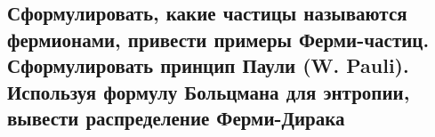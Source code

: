 \subsection{Сформулировать, какие частицы называются фермионами, привести примеры Ферми-частиц.
Сформулировать принцип Паули (W. Pauli). Используя формулу Больцмана для энтропии, вывести
распределение Ферми-Дирака}


